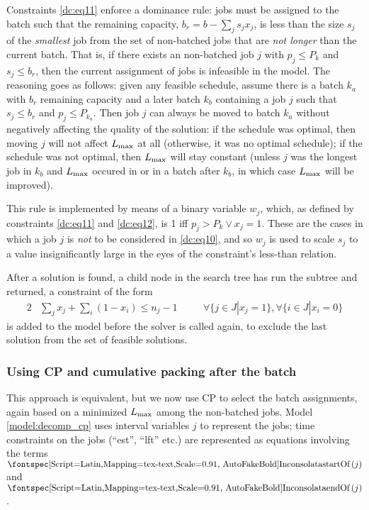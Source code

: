Constraints \eqref{dc:eq11} enforce a dominance rule: jobs must be assigned to
the batch such that the remaining capacity, $b_r = b - \sum_j s_j x_j$, is less
than the size $s_j$ of the \textit{smallest} job from the set of non-batched
jobs that are \textit{not longer} than the current batch. That is, if there
exists an non-batched job $j$ with $p_j \leq P_k$ and $s_j \leq b_r$, then the
current assignment of jobs is infeasible in the model. The reasoning goes as
follows: given any feasible schedule, assume there is a batch $k_a$ with $b_r$
remaining capacity and a later batch $k_b$ containing a job $j$ such that $s_j
\leq b_r$ and $p_j \leq P_{k_a}$. Then job $j$ can always be moved to batch
$k_a$ without negatively affecting the quality of the solution: if the schedule
was optimal, then moving $j$ will not affect $L_{\text{max}}$ at all (otherwise, it was
no optimal schedule); if the schedule was not optimal, then $L_{\text{max}}$ will stay
constant (unless $j$ was the longest job in $k_b$ and $L_{\text{max}}$ occured in or in a
batch after $k_b$, in which case $L_{\text{max}}$ will be improved).

This rule is implemented by means of a binary variable $w_j$, which, as defined
by constraints \eqref{dc:eq11} and \eqref{dc:eq12}, is 1 iff $p_j > P_k \lor x_j
= 1$. These are the cases in which a job $j$ is \textit{not} to be considered in
\eqref{dc:eq10}, and so $w_j$ is used to scale $s_j$ to a value insignificantly
large in the eyes of the constraint's less-than relation.

After a solution is found, a child node in the search tree has run the subtree
and returned, a constraint of the form 
\begin{alignat}{2}
& \sum_j x_j + \sum_i (1-x_i) \leq n_j - 1 \quad && \forall \{j \in J | x_j =
1\}, \forall \{i \in J | x_i = 0 \}
\end{alignat}
is added to the model before the solver is called again, to exclude the last
solution from the set of feasible solutions. 

\subsubsection{Using CP and cumulative packing after the
batch}\label{sec:cpdecomp}
This approach is equivalent, but we now use CP to select the batch assignments,
again based on a minimized $L_{\text{max}}$ among the non-batched jobs. Model
\ref{model:decomp_cp} uses interval variables $j$ to represent the jobs;
time constraints on the jobs (``est'', ``lft'' etc.) are represented as
equations involving the terms $\startOf(j)$ and $\endOf(j)$.

